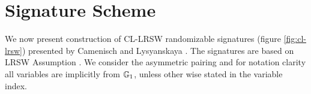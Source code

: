 


\section{Signature Scheme}
We now present construction of CL-LRSW randomizable signatures (figure \ref{fig:cl-lrsw}) presented by Camenisch and Lysyanskaya \cite{anon-creds-cl04}. The signatures are based on LRSW Assumption \cite{pseudonym-systems}. We consider the asymmetric pairing and for notation clarity all variables are implicitly from $\mathbb{G}_1$, unless other wise stated in the variable index. 


